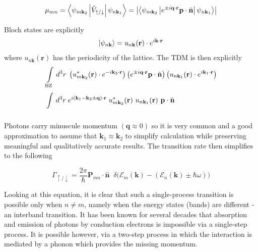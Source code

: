 \begin{tcolorbox}[title={Note: Transition Dipole Matrix (TDM)}]
\begin{equation}
\mu_{mn}=\left\langle \psi_{m\mathbf{k}_{2}} \left| \hat{V}_{\uparrow / \downarrow} \right| \psi_{n\mathbf{k}_{1}} \right\rangle = \left|\left\langle \psi_{m\mathbf{k}_{2}} \left| {\large e^{ \pm i\mathbf{q}\cdot \mathbf{r} }}\mathbf{p}\cdot  \hat{\mathbf{n}}\right| \psi_{n\mathbf{k}_{1}} \right\rangle\right|
\label{eq:tdm_definition}
\end{equation}

Bloch states are explicitly
\begin{equation}
\ket{\psi_{n\mathbf{k}}}= u_{n\mathbf{k}}(\mathbf{r}) \cdot{\large e^{ i\mathbf{k}\cdot \mathbf{r} }}
\label{eq:bloch_states}
\end{equation}
where $u_{n\mathbf{k}}(\mathbf{r})$ has the periodicity of the lattice. The TDM is then explicitly
\begin{align}
&\int\limits_{\text{BZ}}  \, d^{3}r  \; \left(u^{*}_{m\mathbf{k}_{2}}(\mathbf{r}) \cdot{\large e^{ -i\mathbf{k}_{2}\cdot \mathbf{r} }}\right) \left({\large e^{ \pm i\mathbf{q}\cdot \mathbf{r} }}\mathbf{p}\cdot  \hat{\mathbf{n}} \right)\left(u_{n\mathbf{k}_{1}}(\mathbf{r}) \cdot{\large e^{ i\mathbf{k}_{1}\cdot \mathbf{r} }}\right)\\
&\int\limits_{}^{}  \, d^{3}r \; {\large e^{ i(\mathbf{k}_{1}-\mathbf{k}_{2}\pm \mathbf{q})\cdot \mathbf{r} }} \; u^{*}_{m\mathbf{k}_{2}}(\mathbf{r}) \  u_{n\mathbf{k}_{1}}(\mathbf{r}) \ \mathbf{p} \cdot\hat{\mathbf{n}}
\label{eq:tdm_explicit}
\end{align}
\end{tcolorbox}

Photons carry minuscule momentum $(\mathbf{q}\approx 0)$ so it is very common and a good approximation to assume that $\mathbf{k}_{1}\approx \mathbf{k}_{2}$ to simplify calculation while preserving meaningful and qualitatively accurate results. The transition rate then simplifies to the following

\begin{equation}
\Gamma_{\uparrow / \downarrow} = \frac{2\pi}{\hbar} \mathbf{P}_{mn}\cdot  \hat{\mathbf{n}} \;\; \delta\Big(  \mathcal{E}_{m}(\mathbf{k}) - (\mathcal{E}_n(\mathbf{k})\pm\hbar\omega)\Big) 
\label{eq:second_order_transition_rate}
\end{equation}

Looking at this equation, it is clear that such a single-process transition is possible only when $n\neq m$, namely when the energy states (bands) are different - an interband transition. It has been known for several decades that absorption and emission of photons by conduction electrons is impossible via a single-step process. It is possible however, via a two-step process in which the interaction is mediated by a phonon which provides the missing momentum.

